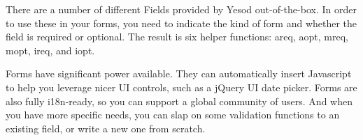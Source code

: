 There are a number of different Fields provided by Yesod out-of-the-box. In order to use these in your forms, you need to indicate the kind of form and whether the field is required or optional. The result is six helper functions: areq, aopt, mreq, mopt, ireq, and iopt.

Forms have significant power available. They can automatically insert Javascript to help you leverage nicer UI controls, such as a jQuery UI date picker. Forms are also fully i18n-ready, so you can support a global community of users. And when you have more specific needs, you can slap on some validation functions to an existing field, or write a new one from scratch.
